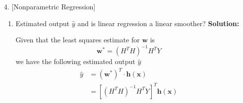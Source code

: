 \documentclass{article}
\renewcommand{\b}[1]{\bm{#1}}
\begin{document}
\begin{enumerate}
\begin{enumerate}
	      \end{enumerate}
	\item [4.] [Nonparametric Regression]
	      \begin{enumerate}
		      \setlength\parindent{2em}
		      \item Estimated output $\hat{y}$ and is linear regression a linear smoother?\newline
		      {\bf Solution:}
          \par Given that the least squares estimate for $\b{w}$ is 
          \[\b{w}^*=\left(H^TH\right)^{-1}H^TY\]
          we have the following estimated output $\hat{y}$
          \begin{align*}
            \hat{y} &= (\b{w}^*)^T\cdot\b{h(x)}\\
            &= \left[\left(H^TH\right)^{-1}H^TY\right]^T\b{h(x)}\\

\end{align*}
\end{enumerate}
\end{enumerate}
\end{document}
